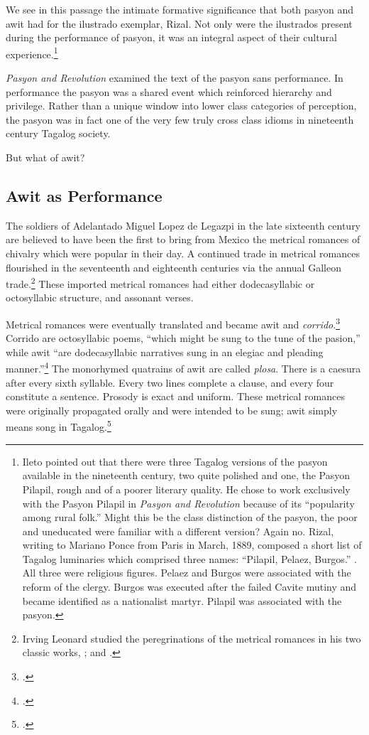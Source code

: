 We see in this passage the intimate formative significance that both pasyon and awit had for the ilustrado exemplar, Rizal. Not only were the ilustrados present during the performance of pasyon, it was an integral aspect of their cultural experience.\footnote{Ileto pointed out that there were three Tagalog versions of the pasyon available in the nineteenth century, two quite polished and one, the Pasyon Pilapil, rough and of a poorer literary quality. He chose to work exclusively with the Pasyon Pilapil in \textit{Pasyon and Revolution} because of its \enquote{popularity among rural folk.} Might this be the class distinction of the pasyon, the poor and uneducated were familiar with a different version? Again no. Rizal, writing to Mariano Ponce from Paris in March, 1889, composed a short list of Tagalog luminaries which comprised three names: \enquote{Pilapil, Pelaez, Burgos.} \parencite[154]{Rizal1931}. All three were religious figures. Pelaez and Burgos were associated with the reform of the clergy. Burgos was executed after the failed Cavite mutiny and became identified as a nationalist martyr. Pilapil was associated with the pasyon.}

\textit{Pasyon and Revolution} examined the text of the pasyon sans performance. In performance the pasyon was a shared event which reinforced hierarchy and privilege. Rather than a unique window into lower class categories of perception, the pasyon was in fact one of the very few truly cross class idioms in nineteenth century Tagalog society. 

But what of awit?

\subsection{Awit as Performance}

The soldiers of Adelantado Miguel Lopez de Legazpi in the late sixteenth century are believed to have been the first to bring from Mexico the metrical romances of chivalry which were popular in their day. A continued trade in metrical romances flourished in the seventeenth and eighteenth centuries via the annual Galleon trade.\footnote{Irving Leonard studied the peregrinations of the metrical romances in his two classic works, \cite{Leonard1933}; and \cite{Leonard1949}.} These imported metrical romances had either dodecasyllabic or octosyllabic structure, and assonant verses.  

Metrical romances were eventually translated and became awit and \textit{corrido}.\footcite[5]{Fernandez1996} Corrido are octosyllabic poems, \enquote{which might be sung to the tune of the pasion,} while awit \enquote{are dodecasyllabic narratives sung in an elegiac and pleading manner.}\footcite[52]{Lumbera1986} The monorhymed quatrains of awit are called \textit{plosa}. There is a caesura after every sixth syllable. Every two lines complete a clause, and every four constitute a sentence. Prosody is exact and uniform. These metrical romances were originally propagated orally and were intended to be sung; awit simply means song in Tagalog.\footcite[4]{Castro1985}

